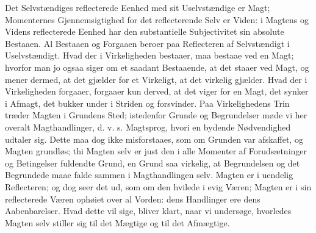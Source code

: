 \documentclass[11pt]{book}
\newcommand{\opage}[1]{\marginnote{\footnotesize\textit{[#1]}}}
\begin{document}
Det Selvstændiges reflecterede Eenhed med sit Uselvstændige er Magt;
Momenternes Gjennemsigtighed for det reflecterende Selv er Viden: i
Magtens og Videns reflecterede Eenhed har den substantielle Subjectivitet
sin absolute Bestaaen. Al Bestaaen og Forgaaen beroer paa Reflecteren af
Selvstændigt i Uselvstændigt. Hvad der i Virkeligheden bestaaer, maa
bestaae ved en Magt; hvorfor man jo ogsaa siger om et saadant Bestaaende,
at det staaer ved Magt, og mener dermed, at det gjælder for et Virkeligt,
at det virkelig gjælder. Hvad der i Virkeligheden forgaaer, forgaaer kun
derved, at det viger for en Magt, det synker i Afmagt, det bukker under i
Striden og forsvinder. Paa Virkelighedens Trin træder Magten i Grundens
Sted; istedenfor Grunde og Begrundelser møde vi her overalt
Magthandlinger, d. v. s. Magtsprog,
\opage{111} \setcounter{footnote}{0}%
hvori en bydende Nødvendighed udtaler sig. Dette maa dog ikke
misforstaaes, som om Grunden var afskaffet, og Magten grundløs; thi
Magten selv er just den i alle Momenter af Forudsætninger og Betingelser
fuldendte Grund, en Grund saa virkelig, at Begrundelsen og det
Begrundede maae falde sammen i Magthandlingen selv. Magten er i uendelig
Reflecteren; og dog seer det ud, som om den hvilede i evig Væren; Magten
er i sin reflecterede Væren ophøiet over al Vorden: dens Handlinger ere
dens Aabenbarelser. Hvad dette vil sige, bliver klart, naar vi undersøge,
hvorledes Magten selv stiller sig til det Mægtige og til det Afmægtige.
\end{document}
